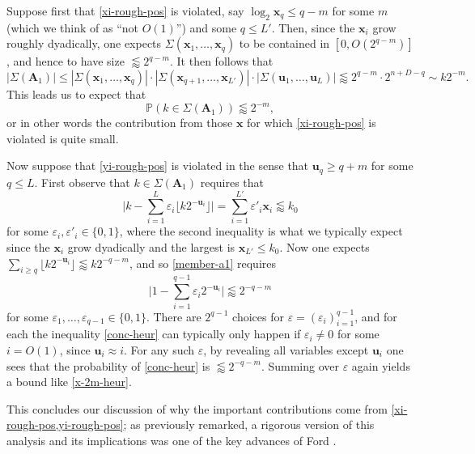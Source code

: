 \documentclass[11pt,reqno]{amsart}
\numberwithin{equation}{section}
\theoremstyle{definition}
\theoremstyle{remark}
\newcommand{\mb}{\mathbb}
\newcommand{\mbf}{\mathbf}
\newcommand{\eps}{\varepsilon}
\renewcommand{\le}{\leqslant}
\renewcommand{\ge}{\geqslant}
\begin{document}
Suppose first that \cref{xi-rough-pos} is violated, say $\log_2 \mbf{x}_q \le q - m$ for some $m$ (which we think of as ``not $O(1)$'') and some $q \le L'$. Then, since the $\mbf{x}_i$ grow roughly dyadically, one expects $\Sigma(\mbf{x}_1,\dots, \mbf{x}_q)$ to be contained in $[0, O(2^{q - m})]$, and hence to have size $\lessapprox 2^{q - m}$. It then follows that 
\[ |\Sigma(\mbf{A}_1)| \le |\Sigma(\mbf{x}_1,\dots, \mbf{x}_q)| \cdot |\Sigma(\mbf{x}_{q+1},\dots, \mbf{x}_{L'})| \cdot |\Sigma(\mbf{u}_1,\dots, \mbf{u}_L)|\lessapprox  2^{q - m} \cdot 2^{n + D - q} \sim k 2^{ - m}.\] This leads us to expect that \begin{equation}\label{x-2m-heur} \mb{P}(k \in \Sigma(\mbf{A}_1)) \lessapprox 2^{-m},\end{equation} or in other words the contribution from those $\mbf{x}$ for which \cref{xi-rough-pos} is violated is quite small.

Now suppose that \cref{yi-rough-pos} is violated in the sense that  $\mbf{u}_q \ge q + m$ for some $q \le L$. First observe that $k \in \Sigma(\mbf{A}_1)$ requires that \begin{equation}\label{member-a1} \big| k - \sum_{i = 1}^L \eps_i \lfloor k 2^{-\mbf{u}_i}\rfloor\big| =  \sum_{i = 1}^{L'} \eps'_i \mbf{x}_i \lessapprox k_0\end{equation} for some $\eps_i, \eps'_i \in \{0,1\}$, where the second inequality is what we typically expect since the $\mbf{x}_i$ grow dyadically and the largest is $\mbf{x}_{L'} \le k_0$.
Now one expects $\sum_{i \ge q} \lfloor k2^{-\mbf{u}_i}\rfloor \lessapprox k2^{-q - m}$, and so \cref{member-a1} requires \begin{equation}\label{conc-heur} \big|1 - \sum_{i = 1}^{q - 1} \eps_i 2^{-\mbf{u}_i}\big| \lessapprox 2^{-q - m}\end{equation} for some $\eps_1,\dots, \eps_{q-1} \in \{0,1\}$. There are $2^{q - 1}$ choices for $\eps = (\eps_i)_{i = 1}^{q - 1}$, and for each the inequality \cref{conc-heur} can typically only happen if $\eps_i \ne 0$ for some $i = O(1)$, since $\mbf{u}_i \approx i$. For any such $\eps$, by revealing all variables except $\mbf{u}_i$ one sees that the probability of \cref{conc-heur} is $\lessapprox 2^{-q - m}$. Summing over $\eps$ again yields a bound like \cref{x-2m-heur}. 

This concludes our discussion of why the important contributions come from \cref{xi-rough-pos,yi-rough-pos}; as previously remarked, a rigorous version of this analysis and its implications was one of the key advances of Ford \cite{For08}.
\end{document}
